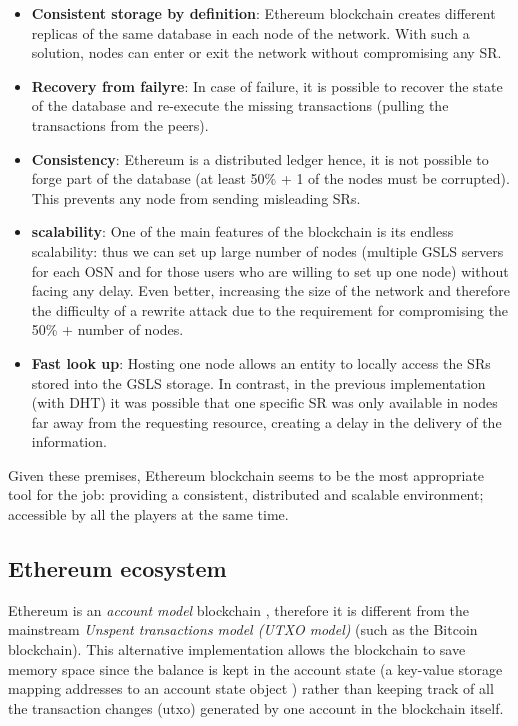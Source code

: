 \begin{itemize}
  \item \textbf{Consistent storage by definition}: Ethereum blockchain creates different replicas of the same database in each node of the network. With such a solution, nodes can enter or exit the network without compromising any SR.
  \item \textbf{Recovery from failyre}: In case of failure, it is possible to recover the state of the database and re-execute the missing transactions (pulling the transactions from the peers).
  \item \textbf{Consistency}: Ethereum is a distributed ledger hence, it is not possible to forge part of the database (at least 50\% + 1 of the nodes must be corrupted). This prevents any node from sending misleading SRs.
  \item \textbf{scalability}: One of the main features of the blockchain is its endless scalability: thus we can set up large number of nodes (multiple GSLS servers for each OSN and for those users who are willing to set up one node) without facing any delay.
  Even better, increasing the size of the network and therefore the difficulty of a rewrite attack due to the requirement for compromising the 50\% + number of nodes.
  \item \textbf{Fast look up}: Hosting one node allows an entity to locally access the SRs stored into the GSLS storage. In contrast, in the previous implementation (with DHT) it was possible that one specific SR was only available in nodes far away from the requesting resource, creating a delay in the delivery of the information. 
\end{itemize}

Given these premises, Ethereum blockchain seems to be the most appropriate tool for the job: providing a consistent, distributed and scalable environment; accessible by all the players at the same time.


\subsection{Ethereum ecosystem}
\label{ethereumEcosystem:1}

Ethereum is an \textit{account model} blockchain \cite{wood_ethereum_2014}, therefore it is different from the mainstream \textit{Unspent transactions model (UTXO model)}  (such as the Bitcoin blockchain). This alternative implementation allows the blockchain to save memory space since the balance is kept in the account state (a key-value storage mapping addresses to an account state object \cite{ethereum_yellowpaper}) rather than keeping track of all the transaction changes (utxo) generated by one account in the blockchain itself.

